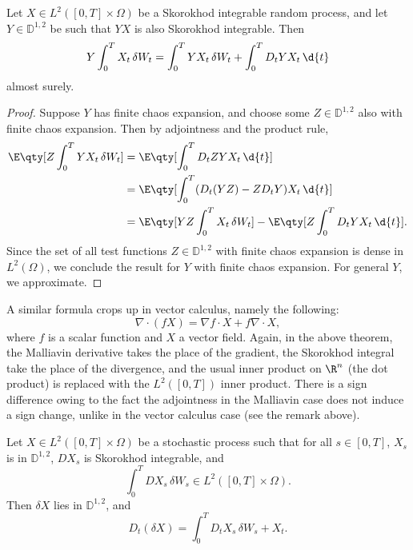 \documentclass[
    a4paper,
    DIV=14,
    abstract=true,
    numbers=noenddot
]{scrartcl}
\begin{document}
\begin{theorem}
	Let $X \in L^2([0,T]\times\Omega)$ be a Skorokhod integrable random
	process, and let $Y \in \mathbb{D}^{1, 2}$ be such that $YX$ is also Skorokhod
	integrable. Then
	\[
		Y \int_0^T X_t \, \delta{W}_t
		= \int_0^T Y X_t \, \delta{W}_t + \int_0^T D_t Y X_t \, \d{t}
	\]
	almost surely.
\end{theorem}
\begin{proof}
	Suppose $Y$ has finite chaos expansion, and choose some $Z \in \mathbb{D}^{1, 2}$
	also with finite chaos expansion. Then by adjointness and the product rule,
	\begin{align*}
		\E\qty[
			Z \int_0^T Y X_t \, \delta{W}_t
		]
		 & = \E\qty[
		\int_0^T D_t{Z} Y X_t \, \d{t}
		]                   \\
		 & = \E\qty[
		\int_0^T (D_t(YZ) - Z D_t{Y}) X_t \, \d{t}
		]                    \\
		 & = \E\qty[
			YZ \int_0^T X_t \, \delta{W}_t
		  ] - \E\qty[
		Z \int_0^T D_t{Y} X_t \, \d{t}
		].
	\end{align*}
	Since the set of all test functions $Z \in \mathbb{D}^{1, 2}$ with finite chaos
	expansion is dense in $L^2(\Omega)$, we conclude the result for $Y$ with
	finite chaos expansion. For general $Y$, we approximate.
\end{proof}

\begin{remark}
	A similar formula crops up in vector calculus, namely the following:
	\[
		\nabla\cdot(fX) = \nabla{f} \cdot X + f \nabla\cdot{X},
	\]
	where $f$ is a scalar function and $X$ a vector field. Again, in the above
	theorem, the Malliavin derivative takes the place of the gradient, the
	Skorokhod integral take the place of the divergence, and the usual inner
	product on $\R^n$ (the dot product) is replaced with the $L^2([0, T])$
	inner product. There is a sign difference owing to the fact the adjointness
	in the Malliavin case does not induce a sign change, unlike in the vector
	calculus case (see the remark above).
\end{remark}

\begin{theorem}\label{divergence prop}
	Let $X \in L^2([0,T]\times\Omega)$ be a stochastic process such that
	for all $s \in [0, T]$, $X_s$ is in $\mathbb{D}^{1, 2}$, $D{X_s}$ is
	Skorokhod integrable, and
	\[
		\int_0^T DX_s \, \delta{W}_s \in L^2([0,T]\times\Omega).
	\]
	Then $\delta{X}$ lies in $\mathbb{D}^{1, 2}$, and
	\[
		D_t(\delta{X}) = \int_0^T D_t{X_s} \, \delta{W}_s + X_t.
	\]
\end{theorem}
\end{document}
